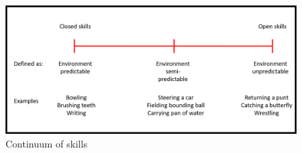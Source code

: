 \begin{figure}
	\centering
	\includegraphics[width=1.0\textwidth]{img/movement_classification2.png}
	\caption{Continuum of skills \cite{Schmidt2011}}
	\label{fig:skills_cont}
\end{figure}


